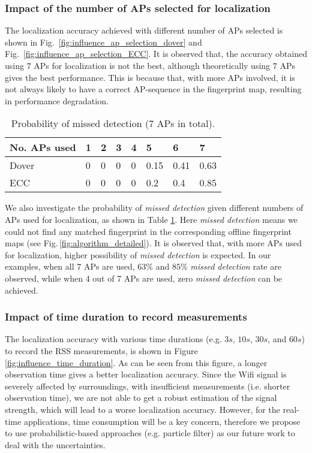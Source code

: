 \documentclass[10pt, conference, letterpaper]{IEEEtran}
\begin{document}
\subsubsection{Impact of the number of APs selected for localization}
The localization accuracy achieved with different number of APs selected is shown in Fig.~\ref{fig:influence_ap_selection_dover} and Fig.~\ref{fig:influence_ap_selection_ECC}. 
It is observed that, the accuracy obtained using $7$ APs for localization is not the best, 
although theoretically using $7$ APs gives the best performance. 
This is because that, with more APs involved, it is not always likely to have a correct AP-sequence in the fingerprint map, resulting in performance degradation.

\begin{table}
 \centering
 \caption[Successful rate]
 {Probability of missed detection (7 APs in total).}
 \centering
 \begin{tabular}{|p{2.5cm}<{\centering}|p{0.3cm}<{\centering}|p{0.3cm}<{\centering}|p{0.3cm}<{\centering}|p{0.45cm}<{\centering}|p{0.45cm}<{\centering}|p{0.45cm}<{\centering}|p{0.45cm}<{\centering}|}
 \hline
 No. APs used &1&2&3&4&5&6&7
 \\\hline
 Dover& 0&0&0&0&0.15&0.41&0.63\\
 \hline
 ECC& 0&0&0&0&0.2&0.4&0.85\\
 \hline
 \end{tabular}
 \label{table:successful_rate_ap_selection}
 \vspace{-0.2in}
 \end{table}

We also investigate the probability of \emph{missed detection} given different numbers of APs used for localization, 
as shown in Table \ref{table:successful_rate_ap_selection}. 
Here \emph{missed detection} means we could not find any matched fingerprint in the corresponding offline fingerprint maps (see Fig.\,\ref{fig:algorithm_detailed}).
It is observed that, with more APs used for localization, higher possibility of \emph{missed detection} is expected. 
In our examples, when all 7 APs are used, $63\%$ and $85\%$ \emph{missed detection} rate are observed, while when 4 out of 7 APs are used, zero \emph{missed detection} can be achieved.

\subsubsection{Impact of time duration to record measurements}
The localization accuracy with various time durations (e.g. $3s$, $10s$, $30s$, and $60s$) to record the RSS measurements, is shown in Figure \ref{fig:influence_time_duration}. 
As can be seen from this figure, a longer observation time gives a better localization accuracy. 
Since the Wifi signal is severely affected by surroundings, with insufficient measurements (i.e. shorter observation time), 
we are not able to get a robust estimation of the signal strength, which will lead to a worse localization accuracy. 
However, for the real-time applications, time consumption will be a key concern, 
therefore we propose to use probabilistic-based approaches (e.g. particle filter) as our future work to deal with the uncertainties.
\end{document}
